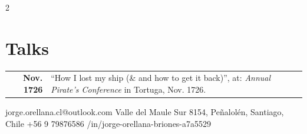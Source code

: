 \documentclass[lighthipster]{simplehipstercv}
\newlength{\rightcolwidth}
\begin{document}
\begin{paracol}{2}
\begin{minipage}[t]{0.3\textwidth}
\section*{Talks}
\begin{tabular}{>{\footnotesize\bfseries}r >{\footnotesize}p{}}
    Nov. 1726 & ``How I lost my ship (\& and how to get it back)'', at: \emph{Annual Pirate's Conference} in Tortuga, Nov. 1726.
\end{tabular}
\end{minipage}






\vfill{} %

\setlength{\parindent}{0pt}
\begin{minipage}[t]{\rightcolwidth}
\begin{center}\fontfamily{\sfdefault}\selectfont \color{black!70}
{\small {} jorge.orellana.cl@outlook.com  Valle del Maule Sur 8154, Peñalolén, Santiago, Chile \newline {} +56 9 79876586  /in/jorge-orellana-briones-a7a5529
}
\end{center}
\end{minipage}

\end{paracol}
\end{document}

